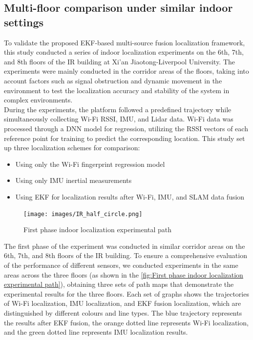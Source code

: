 \documentclass[12pt,a4paper]{article}
\numberwithin{equation}{section}
\begin{document}
\subsection{Multi-floor comparison under similar indoor settings}
To validate the proposed EKF-based multi-source fusion localization framework, this study conducted a series of indoor localization experiments on the 6th, 7th, and 8th floors of the IR building at Xi'an Jiaotong-Liverpool University. The experiments were mainly conducted in the corridor areas of the floors, taking into account factors such as signal obstruction and dynamic movement in the environment to test the localization accuracy and stability of the system in complex environments.\\
During the experiments, the platform followed a predefined trajectory while simultaneously collecting Wi-Fi RSSI, IMU, and Lidar data. Wi-Fi data was processed through a DNN model for regression, utilizing the RSSI vectors of each reference point for training to predict the corresponding location. This study set up three localization schemes for comparison: 
\begin{itemize}
    \item Using only the Wi-Fi fingerprint regression model
    \item Using only IMU inertial measurements
    \item Using EKF for localization results after Wi-Fi, IMU, and SLAM data fusion
\end{itemize}
\begin{figure}[H]
    \centering
    \texttt{[image: images/IR\_half\_circle.png]}
    \caption{First phase indoor localization experimental path}
    \label{fig:First phase indoor localization experimental path}
\end{figure}
The first phase of the experiment was conducted in similar corridor areas on the 6th, 7th, and 8th floors of the IR building. To ensure a comprehensive evaluation of the performance of different sensors, we conducted experiments in the same areas across the three floors (as shown in the \autoref{fig:First phase indoor localization experimental path}), obtaining three sets of path maps that demonstrate the experimental results for the three floors. Each set of graphs shows the trajectories of Wi-Fi localization, IMU localization, and EKF fusion localization, which are distinguished by different colours and line types. The blue trajectory represents the results after EKF fusion, the orange dotted line represents Wi-Fi localization, and the green dotted line represents IMU localization results.\\
\end{document}
